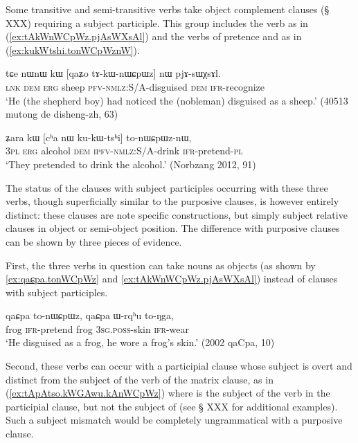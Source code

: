 Some transitive and semi-transitive verbs take object complement clauses (§ XXX) requiring a subject participle. This group includes the verb  as in (\ref{ex:tAkWnWCpWz.pjAsWXsAl}) and the verbs of pretence  and  as in (\ref{ex:kukWtshi.tonWCpWznW}). 

\begin{exe}
\ex \label{ex:tAkWnWCpWz.pjAsWXsAl}
 \gll tɕe nɯnɯ kɯ [qaʑo tɤ-kɯ-nɯɕpɯz] nɯ pjɤ-sɯχsɤl. \\
 \textsc{lnk} \textsc{dem} \textsc{erg} sheep \textsc{pfv}-\textsc{nmlz}:S/A-disguised \textsc{dem} \textsc{ifr}-recognize \\
\glt `He (the shepherd boy) had noticed the (nobleman) disguised as a sheep.' (40513 mutong de disheng-zh, 63)
\end{exe}

\begin{exe}
\ex \label{ex:kukWtshi.tonWCpWznW}
 \gll  ʑara kɯ [cʰa nɯ ku-kɯ-tsʰi] to-nɯɕpɯz-nɯ, \\
\textsc{3pl} \textsc{erg} alcohol \textsc{dem} \textsc{ipfv}-\textsc{nmlz}:S/A-drink \textsc{ifr}-pretend-\textsc{pl} \\
\glt  `They pretended to drink the alcohol.'  (Norbzang 2012, 91)
\end{exe}

The status of the clauses with subject participles occurring with these three verbs, though superficially similar to the purposive clauses, is however entirely distinct: these clauses are note specific constructions, but simply subject relative clauses in object or semi-object position. The difference with purposive clauses can be shown by three pieces of evidence. 

First, the three verbs in question can take nouns as objects (as shown by \ref{ex:qaɕpa.tonWCpWz} and \ref{ex:tAkWnWCpWz.pjAsWXsAl}) instead of clauses with subject participles. 

\begin{exe}
\ex \label{ex:qaɕpa.tonWCpWz}
 \gll  qaɕpa to-nɯɕpɯz, qaɕpa ɯ-rqʰu to-ŋga, \\
frog \textsc{ifr}-pretend frog \textsc{3sg}.\textsc{poss}-skin \textsc{ifr}-wear \\
\glt `He disguised as a frog, he wore a frog's skin.' (2002 qaCpa, 10)
\end{exe}
 
 Second, these verbs can occur with a participial clause whose subject is overt and distinct from the subject of the verb of the matrix clause, as in (\ref{ex:tApAtso.kWGAwu.kAnWCpWz}) where   is the subject of the verb  in the participial clause, but not the subject of   (see § XXX for additional examples). Such a subject mismatch would be completely ungrammatical with a purposive clause.
 
